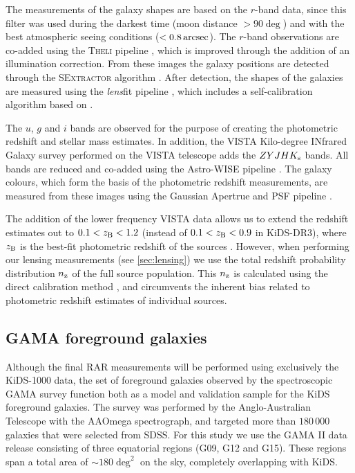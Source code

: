 \documentclass[usenatbib]{mnras}
\newcommand{\as}{\, {\rm arcsec}}
\newcommand{\un}[1]{_{\rm #1}}
\begin{document}
The measurements of the galaxy shapes are based on the $r$-band data, since this filter was used during the darkest time (moon distance $> 90 \deg$) and with the best atmospheric seeing conditions ($<0.8 \as$). The $r$-band observations are co-added using the {\scshape Theli} pipeline \cite[]{erben2013}, which is improved through the addition of an illumination correction. From these images the galaxy positions are detected through the {\scshape SExtractor} algorithm \cite[]{bertin1996}. After detection, the shapes of the galaxies are measured using the \emph{lens}fit pipeline \cite[]{miller2007,miller2013}, which includes a self-calibration algorithm based on \cite{fenechconti2017}.

The $u$, $g$ and $i$ bands are observed for the purpose of creating the photometric redshift and stellar mass estimates. In addition, the  VISTA Kilo-degree INfrared Galaxy survey \cite[VIKING,][]{edge2013} performed on the VISTA telescope adds the $ZYJHK_{\rm s}$ bands. All bands are reduced and co-added using the Astro-WISE pipeline \cite[]{mcfarland2013}. The galaxy colours, which form the basis of the photometric redshift measurements, are measured from these images using the Gaussian Apertrue and PSF pipeline \cite[GAaP][]{kuijken2008,kuijken2015}.

The addition of the lower frequency VISTA data allows us to extend the redshift estimates out to $0.1<z\un{B}<1.2$ (instead of $0.1<z\un{B}<0.9$ in KiDS-DR3), where $z\un{B}$ is the best-fit photometric redshift of the sources \cite[]{benitez2000,hildebrandt2012}. However, when performing our lensing measurements (see \ref{sec:lensing}) we use the total redshift probability distribution $n\un{z}$ of the full source population. This $n\un{z}$ is calculated using the direct calibration method \cite[DIR,][]{hildebrandt2017}, and circumvents the inherent bias related to photometric redshift estimates of individual sources.

\subsection{GAMA foreground galaxies}
\label{sec:gama}

Although the final RAR measurements will be performed using exclusively the KiDS-1000 data, the set of foreground galaxies observed by the spectroscopic GAMA survey \cite[]{driver2011} function both as a model and validation sample for the KiDS foreground galaxies. The survey was performed by the Anglo-Australian Telescope with the AAOmega spectrograph, and targeted more than $180 \, 000$ galaxies that were selected from SDSS. For this study we use the GAMA II data release \cite[]{liske2015} consisting of three equatorial regions (G09, G12 and G15). These regions span a total area of $\sim180 \deg^2$ on the sky, completely overlapping with KiDS.
\end{document}
